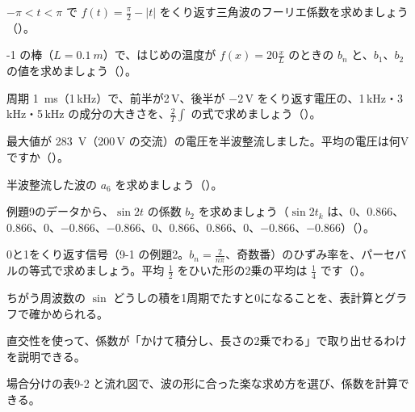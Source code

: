 \bkproblem $-\pi<t<\pi$ で $f(t)=\frac{\pi}{2}-|t|$ をくり返す三角波のフーリエ係数を求めましょう\mbox{（）}。

-1 の棒（$L=\qty{0.1}{m}$）で、はじめの温度が $f(x)=20\frac{x}{L}$ のときの $b_n$ と、$b_1$、$b_2$ の値を求めましょう\mbox{（）}。

\bkproblem 周期 \qty{1}{ms}（1\,kHz）で、前半が2\,V、後半が $-2$\,V をくり返す電圧の、1\,kHz・3\,kHz・5\,kHz の成分の大きさを、$\frac{2}{T}\int$ の式で求めましょう\mbox{（）}。

\bkproblem 最大値が \qty{283}{V}（200\,V の交流）の電圧を半波整流しました。平均の電圧は何Vですか\mbox{（）}。


\bkproblem 半波整流した波の $a_6$ を求めましょう\mbox{（）}。

\bkproblem 例題9のデータから、$\sin2t$ の係数 $b_2$ を求めましょう（$\sin2t_k$ は、0、0.866、0.866、0、$-0.866$、$-0.866$、0、0.866、0.866、0、$-0.866$、$-0.866$）\mbox{（）}。

\bkproblem 0と1をくり返す信号（9-1 の例題2。$b_n=\frac{2}{n\pi}$、奇数番）のひずみ率を、パーセバルの等式で求めましょう。平均 $\frac12$ をひいた形の2乗の平均は $\frac14$ です\mbox{（）}。

\begin{furikaeri}
\begin{checklist}
\item ちがう周波数の $\sin$ どうしの積を1周期でたすと0になることを、表計算とグラフで確かめられる。
\item 直交性を使って、係数が「かけて積分し、長さの2乗でわる」で取り出せるわけを説明できる。
\item 場合分けの表9-2 と流れ図で、波の形に合った楽な求め方を選び、係数を計算できる。
\end{checklist}
\end{furikaeri}

